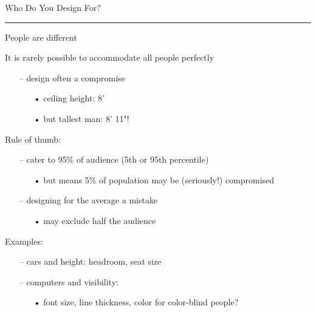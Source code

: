 \documentclass[pdf]{beamer}
\begin{document}
\begin{frame}
	{Who Do You Design For?}{\textcolor{red}{\rule{12cm}{1.2pt}}}
	
  People are different

  It is rarely possible to accommodate all people perfectly
  \begin{itemize}
    \item[--] \small{design often a compromise}
      \begin{itemize}
        \item[\textcolor{black}{•}] \footnotesize{ceiling height:  8'}
        \item[\textcolor{black}{•}] \footnotesize{but tallest man: 8' 11"!}
      \end{itemize}
  \end{itemize}
\smallskip

  Rule of thumb:
  \begin{itemize}
    \item[--] \small{cater to 95\% of audience (5th or 95th percentile)}
      \begin{itemize}
      	\item[\textcolor{black}{•}]   \footnotesize{but means 5\% of population may be (seriously!) compromised}
      \end{itemize}
    \item[--]  \small{designing for the average a mistake}
      \begin{itemize}
      	\item[\textcolor{black}{•}]  \footnotesize{ may exclude half the audience}
      \end{itemize}
  \end{itemize}

\smallskip

  Examples:
  \begin{itemize}
    \item[--]   \small{cars and height: headroom, seat size}
    \item[--]    \small{computers and visibility: }
      \begin{itemize}
      	\item[\textcolor{black}{•}]  \footnotesize{font size, line thickness, color for color-blind people?}
      \end{itemize}
   \end{itemize}


\end{frame}
\end{document}
